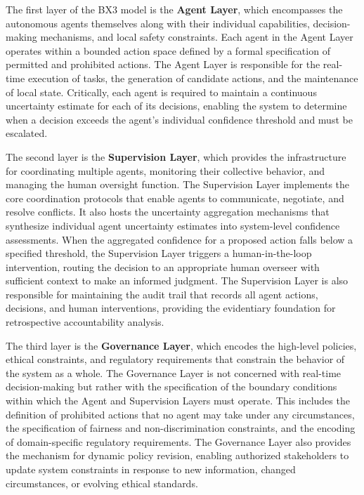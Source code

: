 The first layer of the BX3 model is the \textbf{Agent Layer}, which encompasses the autonomous agents themselves along with their individual capabilities, decision-making mechanisms, and local safety constraints. Each agent in the Agent Layer operates within a bounded action space defined by a formal specification of permitted and prohibited actions. The Agent Layer is responsible for the real-time execution of tasks, the generation of candidate actions, and the maintenance of local state. Critically, each agent is required to maintain a continuous uncertainty estimate for each of its decisions, enabling the system to determine when a decision exceeds the agent's individual confidence threshold and must be escalated.

The second layer is the \textbf{Supervision Layer}, which provides the infrastructure for coordinating multiple agents, monitoring their collective behavior, and managing the human oversight function. The Supervision Layer implements the core coordination protocols that enable agents to communicate, negotiate, and resolve conflicts. It also hosts the uncertainty aggregation mechanisms that synthesize individual agent uncertainty estimates into system-level confidence assessments. When the aggregated confidence for a proposed action falls below a specified threshold, the Supervision Layer triggers a human-in-the-loop intervention, routing the decision to an appropriate human overseer with sufficient context to make an informed judgment. The Supervision Layer is also responsible for maintaining the audit trail that records all agent actions, decisions, and human interventions, providing the evidentiary foundation for retrospective accountability analysis.

The third layer is the \textbf{Governance Layer}, which encodes the high-level policies, ethical constraints, and regulatory requirements that constrain the behavior of the system as a whole. The Governance Layer is not concerned with real-time decision-making but rather with the specification of the boundary conditions within which the Agent and Supervision Layers must operate. This includes the definition of prohibited actions that no agent may take under any circumstances, the specification of fairness and non-discrimination constraints, and the encoding of domain-specific regulatory requirements. The Governance Layer also provides the mechanism for dynamic policy revision, enabling authorized stakeholders to update system constraints in response to new information, changed circumstances, or evolving ethical standards.

